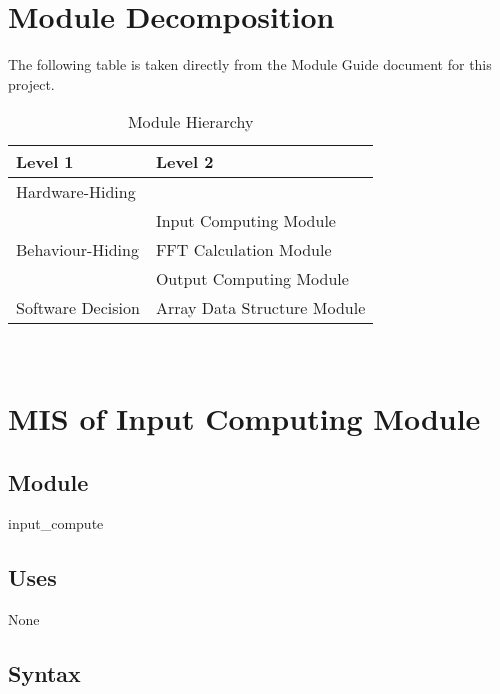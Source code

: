 \documentclass[12pt, titlepage]{article}
\begin{document}
\section{Module Decomposition}

The following table is taken directly from the Module Guide document for this project.

\begin{table}[h!]
\centering
\begin{tabular}{p{} p{}}
\toprule
\textbf{Level 1} & \textbf{Level 2}\\
\midrule

{Hardware-Hiding} & ~ \\
\midrule

\multirow{3}{0.3\textwidth}{Behaviour-Hiding}
& Input Computing Module\\
& FFT Calculation Module\\
& Output Computing Module\\
\midrule

\multirow{1}{0.3\textwidth}{Software Decision} & Array Data Structure Module\\
\bottomrule

\end{tabular}
\caption{Module Hierarchy}
\label{TblMH}
\end{table}


\newpage
~\newpage

\section{MIS of Input Computing Module} \label{Input} 

\subsection{Module}

input\_compute

\subsection{Uses}
None
\subsection{Syntax}
\end{document}
